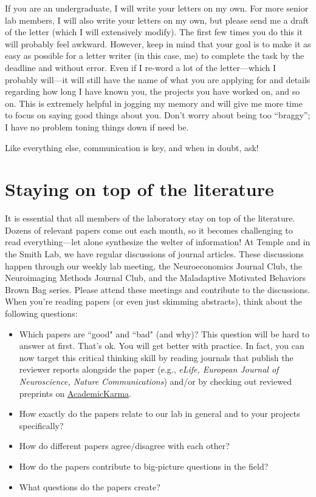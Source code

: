 \documentclass[letterpaper,12pt,oneside]{memoir}
\begin{document}
If you are an undergraduate, I will write your letters on my own. For more senior lab members, I will also write your letters on my own, but please send me a draft of the letter (which I will extensively modify). The first few times you do this it will probably feel awkward. However, keep in mind that your goal is to make it as easy as possible for a letter writer (in this case, me) to complete the task by the deadline and without error. Even if I re-word a lot of the letter---which I probably will---it will still have the name of what you are applying for and details regarding how long I have known you, the projects you have worked on, and so on. This is extremely helpful in jogging my memory and will give me more time to focus on saying good things about you. Don't worry about being too ``braggy''; I have no problem toning things down if need be.

Like everything else, communication is key, and when in doubt, ask!

\section{Staying on top of the literature}
\label{sec:literature}

It is essential that all members of the laboratory stay on top of the literature. Dozens of relevant papers come out each month, so it becomes challenging to read everything---let alone synthesize the welter of information! At Temple and in the Smith Lab, we have regular discussions of journal articles. These discussions happen through our weekly lab meeting, the Neuroeconomics Journal Club, the Neuroimaging Methods Journal Club, and the Maladaptive Motivated Behaviors Brown Bag series. Please attend these meetings and contribute to the discussions. When you're reading papers (or even just skimming abstracts), think about the following questions:

\begin{itemize}
\item Which papers are ``good" and ``bad" (and why)? This question will be hard to answer at first. That's ok. You will get better with practice. In fact, you can now target this critical thinking skill by reading journals that publish the reviewer reports alongside the paper (e.g., \textit{eLife, European Journal of Neuroscience, Nature Communications}) and/or by checking out reviewed preprints on \href{http://academickarma.org/}{AcademicKarma}.
\item How exactly do the papers relate to our lab in general and to your projects specifically?
\item How do different papers agree/disagree with each other?
\item How do the papers contribute to big-picture questions in the field? 
\item What questions do the papers create?  
\end{itemize}
\end{document}

